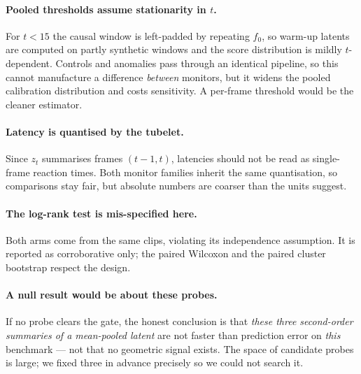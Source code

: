\paragraph{Pooled thresholds assume stationarity in $t$.}
For $t<15$ the causal window is left-padded by repeating $f_0$, so warm-up
latents are computed on partly synthetic windows and the score distribution is
mildly $t$-dependent. Controls and anomalies pass through an identical pipeline,
so this cannot manufacture a difference \emph{between} monitors, but it widens
the pooled calibration distribution and costs sensitivity. A per-frame threshold
would be the cleaner estimator.

\paragraph{Latency is quantised by the tubelet.}
Since $z_t$ summarises frames $(t-1,t)$, latencies should not be read as
single-frame reaction times. Both monitor families inherit the same
quantisation, so comparisons stay fair, but absolute numbers are coarser than
the units suggest.

\paragraph{The log-rank test is mis-specified here.}
Both arms come from the same clips, violating its independence assumption. It is
reported as corroborative only; the paired Wilcoxon and the paired cluster
bootstrap respect the design.

\paragraph{A null result would be about these probes.}
If no probe clears the gate, the honest conclusion is that \emph{these three
second-order summaries of a mean-pooled latent} are not faster than prediction
error on \emph{this} benchmark --- not that no geometric signal exists. The
space of candidate probes is large; we fixed three in advance precisely so we
could not search it.
